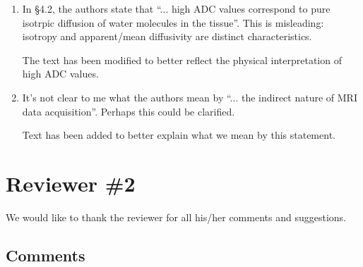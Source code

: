 \documentclass[11pt]{article}
\begin{document}
\begin{enumerate}
\item In \S4.2, the authors state that ``... high ADC values correspond
  to pure isotrpic diffusion of water molecules in the tissue''.  This
  is misleading: isotropy and apparent/mean diffusivity are distinct
  characteristics.

  The text has been modified to better reflect the physical
  interpretation of high ADC values.

\item It's not clear to me what the authors mean by ``... the indirect
  nature of MRI data acquisition''.  Perhaps this could be clarified.

  Text has been added to better explain what we mean by this
  statement.

\end{enumerate}

\section*{Reviewer \#2}

We would like to thank the reviewer for all his/her comments and
suggestions.

\subsection*{Comments}
\end{document}
